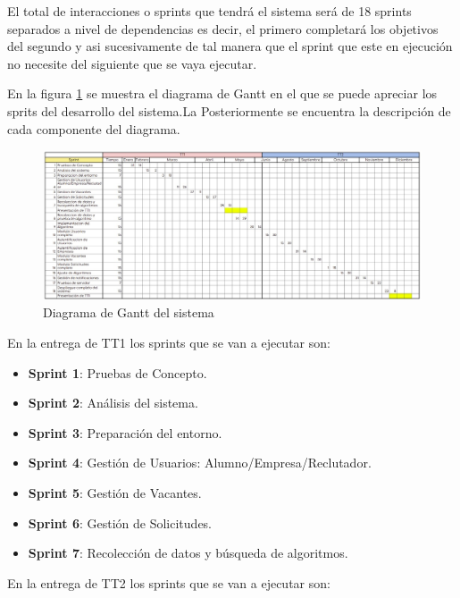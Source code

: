 El total de interacciones o sprints que tendrá el sistema será de 18 sprints separados a nivel de dependencias es decir, el primero
completará los objetivos del segundo y asi sucesivamente de tal manera que el sprint que este en ejecución 
no necesite del siguiente que se vaya ejecutar.
\newline

En la figura \ref{fig:cronograma} se muestra el diagrama de Gantt en el que se puede apreciar los sprits del desarrollo del sistema.La
Posteriormente se encuentra la descripción de cada componente del diagrama.

\begin{figure}[hbtp!]
    \begin{center}
        \includegraphics[width=1\textwidth]{propuesta/imagenes/gantt.jpeg}
    \end{center}
    \caption{Diagrama de Gantt del sistema}
    \label{fig:cronograma}
\end{figure}

En la entrega de TT1 los sprints que se van a ejecutar son:

\begin{itemize}
    \item \textbf{Sprint 1}: Pruebas de Concepto.
    \item \textbf{Sprint 2}: Análisis del sistema.
    \item \textbf{Sprint 3}: Preparación del entorno.
    \item \textbf{Sprint 4}: Gestión de Usuarios: Alumno/Empresa/Reclutador.
    \item \textbf{Sprint 5}: Gestión de Vacantes.
    \item \textbf{Sprint 6}: Gestión de Solicitudes.
    \item \textbf{Sprint 7}: Recolección de datos y búsqueda de algoritmos.
\end{itemize}


En la entrega de TT2 los sprints que se van a ejecutar son:

